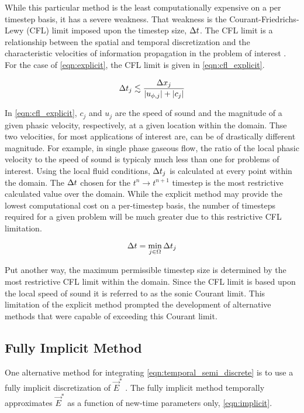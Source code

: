 While this particular method is the least computationally expensive on a per timestep basis, it has a severe weakness.
That weakness is the Courant-Friedrichs-Lewy (CFL) limit imposed upon the timestep size, $\dt{}$.
The CFL limit is a relationship between the spatial and temporal discretization and the characteristic velocities of information propagation in the problem of interest \cite{LeVeque2007, Tannehill1997}.
For the case of \eqref{eqn:explicit}, the CFL limit is given in \eqref{eqn:cfl_explicit}.

\begin{equation}
\label{eqn:cfl_explicit}
\dt{}_j \lesssim \frac{\dx{}_j}{|u_{\phi,j}|+|c_j|}
\end{equation}

In \eqref{eqn:cfl_explicit}, $c_j$ and $u_j$ are the speed of sound and the magnitude of a given phasic velocity, respectively, at a given location within the domain.
Thse two velocities, for most applications of interest are, can be of drastically different magnitude.
For example, in single phase gaseous flow, the ratio of the local phasic velocity to the speed of sound is typicaly much less than one for problems of interest.
Using the local fluid conditions, $\dt{}_j$ is calculated at every point within the domain.
The $\dt{}$ chosen for the $t^{n} \rightarrow t^{n+1}$ timestep is the most restrictive calculated value over the domain.
While the explicit method may provide the lowest computational cost on a per-timestep basis, the number of timesteps required for a given problem will be much greater due to this restrictive CFL limitation.

\begin{equation}
\label{eqn:global_cfl}
\dt{} = \min_{j \in \Omega} \dt{}_j
\end{equation}

Put another way, the maximum permissible timestep size is determined by the most restrictive CFL limit within the domain.
Since the CFL limit is based upon the local speed of sound it is referred to as the sonic Courant limit.
This limitation of the explicit method prompted the development of alternative methods that were capable of exceeding this Courant limit.

\subsection{Fully Implicit Method}
\label{subsect:numerics_fully_implicit}
One alternative method for integrating \eqref{eqn:temporal_semi_discrete} is to use a fully implicit discretization of $\vec{E}^{*}$ \cite{Frepoli2003, Barre1990}.
The fully implicit method temporally approximates $\vec{E}^{*}$ as a function  of new-time parameters only, \eqref{eqn:implicit}.

